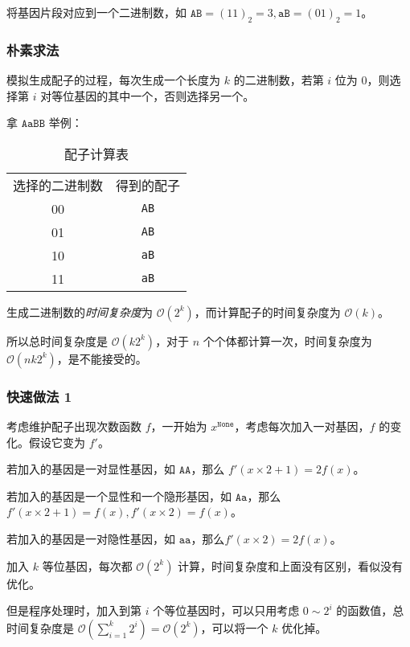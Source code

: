 \documentclass{article}
\begin{document}
将基因片段对应到一个二进制数，如 $\texttt{AB}=(11)_2=3,\texttt{aB}=(01)_2=1$。

\subsubsection*{朴素求法}

模拟生成配子的过程，每次生成一个长度为 $k$ 的二进制数，若第 $i$ 位为 $0$，则选择第 $i$ 对等位基因的其中一个，否则选择另一个。

拿 $\texttt{AaBB}$ 举例：

\begin{table}[htbp]
    \centering
    \caption{配子计算表}
    \begin{tabular}{|c|c|}
        选择的二进制数 & 得到的配子 \\
        00 & \texttt{AB} \\
        01 & \texttt{AB} \\
        10 & \texttt{aB} \\
        11 & \texttt{aB} \\
    \end{tabular}
\end{table}

生成二进制数的\textsl{时间复杂度}为 $\mathcal O(2^k)$，而计算配子的时间复杂度为 $\mathcal O(k)$。

所以总时间复杂度是 $\mathcal O(k 2^k)$，对于 $n$ 个个体都计算一次，时间复杂度为 $\mathcal O(nk 2^k)$，是不能接受的。

\subsubsection*{快速做法 1}

考虑维护配子出现次数函数 $f$，一开始为 $x^{\texttt{None}}$，考虑每次加入一对基因，$f$ 的变化。假设它变为 $f'$。

若加入的基因是一对显性基因，如 $\texttt{AA}$，那么 $f'(x \times 2 + 1)=2f(x)$。

若加入的基因是一个显性和一个隐形基因，如 $\texttt{Aa}$，那么 $f'(x \times 2 + 1)=f(x),f'(x \times 2)=f(x)$。

若加入的基因是一对隐性基因，如 $\texttt{aa}$，那么$f'(x \times 2)=2f(x)$。

加入 $k$ 等位基因，每次都 $\mathcal O(2^k)$ 计算，时间复杂度和上面没有区别，看似没有优化。

但是程序处理时，加入到第 $i$ 个等位基因时，可以只用考虑 $0 \sim 2^i$ 的函数值，总时间复杂度是 $\mathcal O(\sum_{i=1}^k 2^i)=\mathcal O(2^k)$，可以将一个 $k$ 优化掉。
\end{document}
